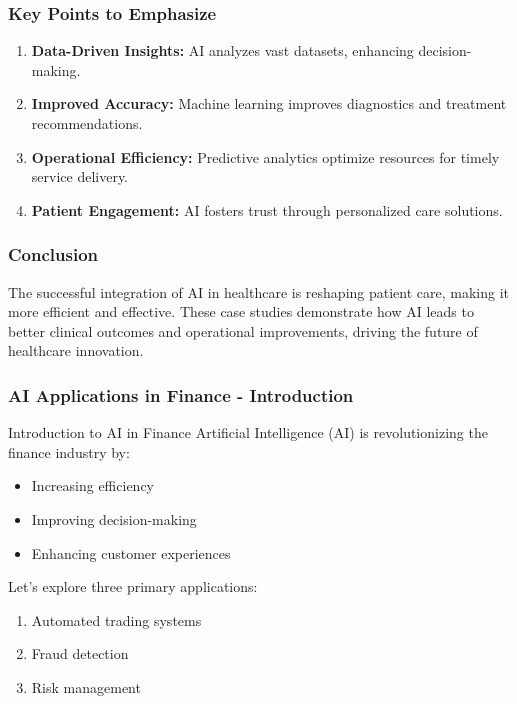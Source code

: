 \documentclass[aspectratio=169]{beamer}
\begin{document}
\begin{frame}[fragile]
    \frametitle{Key Points to Emphasize}
    \begin{enumerate}
        \item \textbf{Data-Driven Insights:} AI analyzes vast datasets, enhancing decision-making.
        \item \textbf{Improved Accuracy:} Machine learning improves diagnostics and treatment recommendations.
        \item \textbf{Operational Efficiency:} Predictive analytics optimize resources for timely service delivery.
        \item \textbf{Patient Engagement:} AI fosters trust through personalized care solutions.
    \end{enumerate}
\end{frame}

\begin{frame}[fragile]
    \frametitle{Conclusion}
    The successful integration of AI in healthcare is reshaping patient care, making it more efficient and effective. These case studies demonstrate how AI leads to better clinical outcomes and operational improvements, driving the future of healthcare innovation.
\end{frame}

\begin{frame}[fragile]
    \frametitle{AI Applications in Finance - Introduction}
    \begin{block}{Introduction to AI in Finance}
        Artificial Intelligence (AI) is revolutionizing the finance industry by:
        \begin{itemize}
            \item Increasing efficiency
            \item Improving decision-making
            \item Enhancing customer experiences
        \end{itemize}
        Let's explore three primary applications:
        \begin{enumerate}
            \item Automated trading systems
            \item Fraud detection
            \item Risk management
        \end{enumerate}
    \end{block}
\end{frame}
\end{document}
